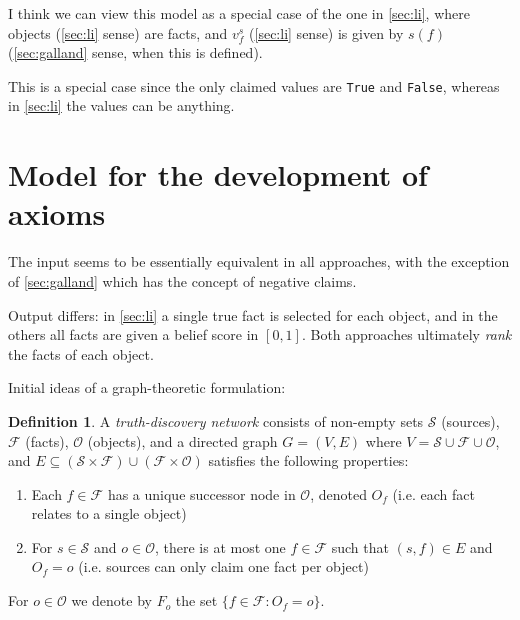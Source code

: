 \documentclass{article}
\theoremstyle{definition}
\newtheorem{definition}{Definition}
\theoremstyle{plain}
\begin{document}
I think we can view this model as a special case of the one in \ref{sec:li},
where objects (\ref{sec:li} sense) are facts, and $v_f^s$ (\ref{sec:li} sense)
is given by $s(f)$ (\ref{sec:galland} sense, when this is defined).

This is a special case since the only claimed values are \texttt{True} and
\texttt{False}, whereas in \ref{sec:li} the values can be anything.

\section{Model for the development of axioms}

The input seems to be essentially equivalent in all approaches, with the
exception of \ref{sec:galland} which has the concept of negative claims.

Output differs: in \ref{sec:li} a single true fact is selected for each object,
and in the others all facts are given a belief score in $[0, 1]$. Both
approaches ultimately \emph{rank} the facts of each object.

Initial ideas of a graph-theoretic formulation:

\begin{definition}

A \emph{truth-discovery network} consists of non-empty sets $\mathcal{S}$
(sources), $\mathcal{F}$ (facts), $\mathcal{O}$ (objects), and a directed graph
$G=(V, E)$ where $V = \mathcal{S} \cup \mathcal{F} \cup \mathcal{O}$, and $E
\subseteq (\mathcal{S} \times \mathcal{F}) \cup (\mathcal{F} \times
\mathcal{O})$ satisfies the following properties:

\begin{enumerate}

\item Each $f \in \mathcal{F}$ has a unique successor node in $\mathcal{O}$,
denoted $O_f$ (i.e. each fact relates to a single object)

\item For $s \in \mathcal{S}$ and $o \in \mathcal{O}$, there is at most one $f
\in \mathcal{F}$ such that $(s, f) \in E$ and $O_f = o$ (i.e. sources can only
claim one fact per object)

\end{enumerate}

For $o \in \mathcal{O}$ we denote by $F_o$ the set $\{f \in \mathcal{F} : O_f =
o \}$.

\end{definition}
\end{document}
